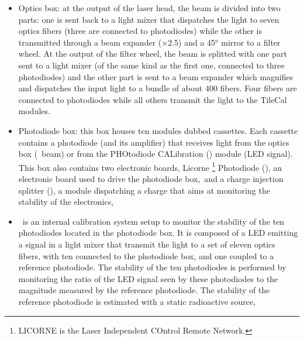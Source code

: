 \begin{itemize}
\item Optics box: at the output of the laser head, the beam is divided into two parts: one 
is sent back to a light mixer that dispatches the light to seven optics fibers (three are connected to photodiodes) while the other is transmitted through a beam expander ($\times$2.5) and a 45$^{o}$ mirror to a filter wheel. At the output of the filter wheel, the beam is splitted with one part sent to a light mixer (of the same kind as the first one, connected to three photodiodes) and the other part is sent to a beam expander which magnifies and dispatches the input light to a bundle of about 400 fibers. Four fibers are connected to photodiodes while all others transmit the light to the TileCal modules.


\item Photodiode box: this box houses ten modules dubbed cassettes. Each cassette contains a photodiode (and its amplifier) that receives light from the optics box (\laser~beam) or from the PHOtodiode CALibration (\phocal) module (LED signal). This box also contains two electronic boards, Licorne \footnote{LICORNE is the Laser Independent COntrol Remote Network.} Photodiode (\licphd), an electronic board used to drive the photodiode box,~and a charge injection splitter (\charinjsplit), a module dispatching a charge that aims at monitoring the stability of the electronics,

\item \phocal~is an internal calibration system setup to monitor the stability of the ten photodiodes located in the photodiode box. It is composed of a LED emitting a signal in a light mixer that transmit the light to a set of eleven optics fibers, with ten connected to the photodiode box, and one coupled to a reference photodiode. 
The stability of the ten photodiodes is performed by monitoring the ratio of the LED signal seen by these photodiodes to the magnitude measured by the reference photodiode. The stability of the reference photodiode is estimated with a static radioactive source,


\end{itemize}
